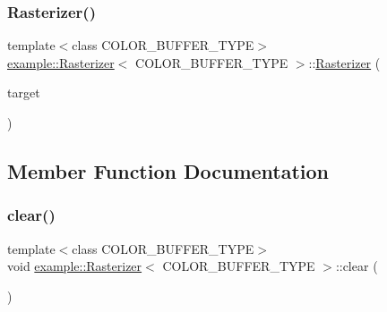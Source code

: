 \subsubsection{\texorpdfstring{Rasterizer()}{Rasterizer()}}
{\footnotesize\ttfamily template$<$class C\+O\+L\+O\+R\+\_\+\+B\+U\+F\+F\+E\+R\+\_\+\+T\+Y\+PE$>$ \\
\mbox{\hyperlink{classexample_1_1_rasterizer}{example\+::\+Rasterizer}}$<$ C\+O\+L\+O\+R\+\_\+\+B\+U\+F\+F\+E\+R\+\_\+\+T\+Y\+PE $>$\+::\mbox{\hyperlink{classexample_1_1_rasterizer}{Rasterizer}} (\begin{DoxyParamCaption}\item[{\mbox{\hyperlink{classexample_1_1_rasterizer_a710beccb975a5f1aa771c44f784da525}{Color\+\_\+\+Buffer}} \&}]{target }\end{DoxyParamCaption})\hspace{0.3cm}{\ttfamily [inline]}}



\subsection{Member Function Documentation}
\mbox{\label{classexample_1_1_rasterizer_a98cb1b7667d18c7038c964e5551d6d56}} 
\subsubsection{\texorpdfstring{clear()}{clear()}\hspace{0.1cm}{\footnotesize\ttfamily [1/2]}}
{\footnotesize\ttfamily template$<$class C\+O\+L\+O\+R\+\_\+\+B\+U\+F\+F\+E\+R\+\_\+\+T\+Y\+PE$>$ \\
void \mbox{\hyperlink{classexample_1_1_rasterizer}{example\+::\+Rasterizer}}$<$ C\+O\+L\+O\+R\+\_\+\+B\+U\+F\+F\+E\+R\+\_\+\+T\+Y\+PE $>$\+::clear (\begin{DoxyParamCaption}{ }\end{DoxyParamCaption})\hspace{0.3cm}{\ttfamily [inline]}}

\mbox{\label{classexample_1_1_rasterizer_afaa4b27e01bc41a8a3fcda71d1799052}} 
